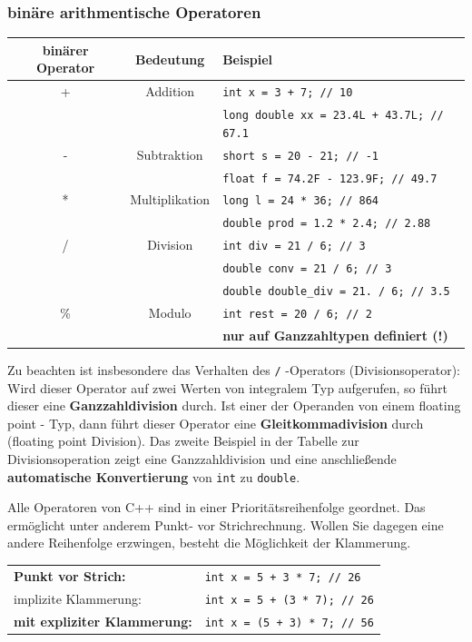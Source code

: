 \documentclass[a4paper]{report}
\begin{document}
\subsubsection{binäre arithmentische Operatoren}
\begin{center}
\begin{tabular}{|c|c|p{8cm}|} \hline
	\textbf{binärer Operator} & \textbf{Bedeutung} & \textbf{Beispiel} \\ \hline
	+ & Addition & \texttt{int x = 3 + 7; // 10} \\
	&& \texttt{long double xx = 23.4L + 43.7L; // 67.1} \\ \hline
	- & Subtraktion & \texttt{short s = 20 - 21; // -1}\\
	&& \texttt{float f = 74.2F - 123.9F; // 49.7} \\ \hline
	* & Multiplikation & \texttt{long l = 24 * 36; // 864}\\
	&& \texttt{double prod = 1.2 * 2.4; // 2.88} \\ \hline
	/ & Division & \texttt{int div = 21 / 6; // 3}\\ 
	&& \texttt{double conv = 21 / 6; // 3} \\
	&& \texttt{double double\_div = 21. / 6; // 3.5} \\ \hline 
	\% & Modulo & \texttt{int rest = 20 / 6; // 2}\\ 
	&& \textbf{nur auf Ganzzahltypen definiert (!)} \\ \hline
\end{tabular}
\end{center}
Zu beachten ist insbesondere das Verhalten des \texttt{/} -Operators (Divisionsoperator): Wird dieser Operator auf zwei Werten von integralem Typ aufgerufen, so führt dieser eine \textbf{Ganzzahldivision} durch. Ist einer der Operanden von einem floating point - Typ, dann führt dieser Operator eine \textbf{Gleitkommadivision} durch (floating point Division). Das zweite Beispiel in der Tabelle zur Divisionsoperation zeigt eine Ganzzahldivision und eine anschließende \textbf{automatische Konvertierung} von \texttt{int} zu \texttt{double}.

Alle Operatoren von C++ sind in einer Prioritätsreihenfolge geordnet. Das ermöglicht unter anderem Punkt- vor Strichrechnung. Wollen Sie dagegen eine andere Reihenfolge erzwingen, besteht die Möglichkeit der Klammerung. %
\begin{center}
	\begin{tabular}{|l|l|} \hline
		\textbf{Punkt vor Strich:} & \texttt{int x = 5 + 3 * 7; // 26} \\
		\quad implizite Klammerung: & \texttt{int x = 5 + (3 * 7); // 26} \\ \hline
		\textbf{mit expliziter Klammerung:} & \texttt{int x = (5 + 3) * 7; // 56} \\ \hline
	\end{tabular}
\end{center}
\end{document}
